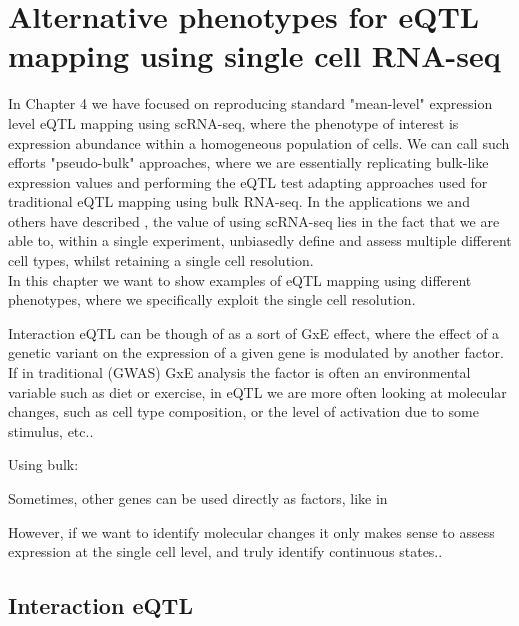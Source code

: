 
\chapter{Alternative phenotypes for eQTL mapping using single cell RNA-seq}

In Chapter 4 we have focused on reproducing standard "mean-level" expression level eQTL mapping using scRNA-seq, where the phenotype of interest is expression abundance within a homogeneous population of cells.
We can call such efforts "pseudo-bulk" approaches, where we are essentially replicating bulk-like expression values and performing the eQTL test adapting approaches used for traditional eQTL mapping using bulk RNA-seq. 
In the applications we and others have described \cite{van2018single,cuomo2020single}, the value of using scRNA-seq lies in the fact that we are able to, within a single experiment, unbiasedly define and assess multiple different cell types, whilst retaining a single cell resolution.\\

In this chapter we want to show examples of eQTL mapping using different phenotypes, where we specifically exploit the single cell resolution.

Interaction eQTL can be though of as a sort of GxE effect, where the effect of a genetic variant on the expression of a given gene is modulated by another factor.
If in traditional (GWAS) GxE analysis the factor is often an environmental variable such as diet or exercise, in eQTL we are more often looking at molecular changes, such as cell type composition, or the level of activation due to some stimulus, etc..

Using bulk:

Sometimes, other genes can be used directly as factors, like in \cite{zhernakova2017identification}

However, if we want to identify molecular changes it only makes sense to assess expression at the single cell level, and truly identify continuous states..



\section{Interaction eQTL}

